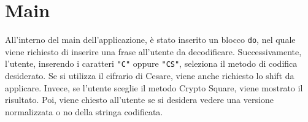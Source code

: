 \section{Main}
All'interno del main dell'applicazione, è stato inserito un blocco \texttt{do}, nel quale viene richiesto di inserire una frase all'utente da decodificare. Successivamente, l'utente, inserendo i caratteri \texttt{"C"} oppure \texttt{"CS"}, seleziona il metodo di codifica desiderato. Se si utilizza il cifrario di Cesare, viene anche richiesto lo shift da applicare. Invece, se l'utente sceglie il metodo Crypto Square, viene mostrato il risultato. Poi, viene chiesto all'utente se si desidera vedere una versione normalizzata o no della stringa codificata.

